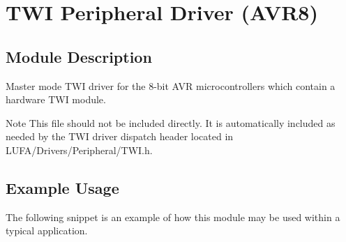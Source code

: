 \hypertarget{group__Group__TWI__AVR8}{\section{T\-W\-I Peripheral Driver (A\-V\-R8)}
\label{group__Group__TWI__AVR8}
}
\hypertarget{group__Group__TWI__AVR8_Sec_ModDescription}{}\subsection{Module Description}\label{group__Group__TWI__AVR8_Sec_ModDescription}
Master mode T\-W\-I driver for the 8-\/bit A\-V\-R microcontrollers which contain a hardware T\-W\-I module.

\begin{DoxyNote}{Note}
This file should not be included directly. It is automatically included as needed by the T\-W\-I driver dispatch header located in L\-U\-F\-A/\-Drivers/\-Peripheral/\-T\-W\-I.\-h.
\end{DoxyNote}
\hypertarget{group__Group__TWI__AVR8_Sec_ExampleUsage}{}\subsection{Example Usage}\label{group__Group__TWI__AVR8_Sec_ExampleUsage}
The following snippet is an example of how this module may be used within a typical application.


